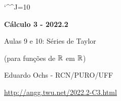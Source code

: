 \documentclass[oneside,12pt]{article}
\begin{document}
\catcode`\^^J=10
\pu
\def\pictgridstyle{\color{GrayPale}\linethickness{0.3pt}}
\def\pictaxesstyle{\linethickness{0.5pt}}
\def\pictnaxesstyle{\color{GrayPale}\linethickness{0.5pt}}
\celllower=2.5pt


\def\u#1{\par{\footnotesize \url{#1}}}

\def\drafturl{http://angg.twu.net/LATEX/2022-2-C3.pdf}
\def\drafturl{http://angg.twu.net/2022.2-C3.html}
\def\draftfooter{\tiny \href{\drafturl}{\jobname{}} \ColorBrown{\shorttoday{} \hours}}

\def\derivs{\mathsf{derivs}}
\def\frt#1{\frac{f^{(#1)}(0)}{#1!}}



%

\thispagestyle{empty}

\begin{center}

\vspace*{1.2cm}

{\bf \Large Cálculo 3 - 2022.2}

\bsk

Aulas 9 e 10: Séries de Taylor

(para funções de $\mathbb{R}$ em $\mathbb{R}$)

\bsk

Eduardo Ochs - RCN/PURO/UFF

\url{http://angg.twu.net/2022.2-C3.html}

\end{center}

\newpage

\end{document}
